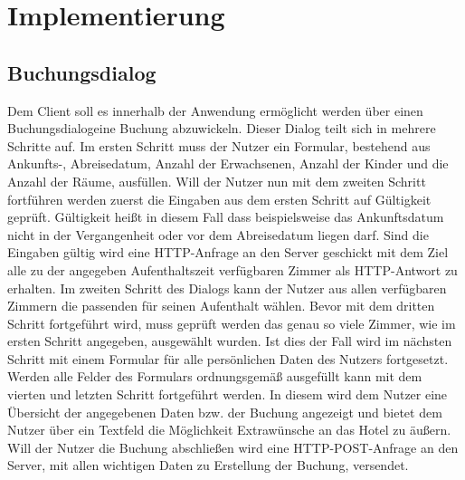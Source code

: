 \chapter{Implementierung}
\section{Buchungsdialog}
Dem Client soll es innerhalb der Anwendung ermöglicht werden über einen \glqq Buchungsdialog\grqq \thickspace eine Buchung abzuwickeln. Dieser Dialog teilt sich in mehrere Schritte auf. Im ersten Schritt muss der Nutzer ein Formular, bestehend aus Ankunfts-, Abreisedatum, Anzahl der Erwachsenen, Anzahl der Kinder und die Anzahl der Räume, ausfüllen. Will der Nutzer nun mit dem zweiten Schritt fortführen werden zuerst die Eingaben aus dem ersten Schritt auf Gültigkeit geprüft. Gültigkeit heißt in diesem Fall dass beispielsweise das Ankunftsdatum nicht in der Vergangenheit oder vor dem Abreisedatum liegen darf. Sind die Eingaben gültig wird eine HTTP-Anfrage an den Server geschickt mit dem Ziel alle zu der angegeben Aufenthaltszeit verfügbaren Zimmer als HTTP-Antwort zu erhalten. Im zweiten Schritt des Dialogs kann der Nutzer aus allen verfügbaren Zimmern die passenden für seinen Aufenthalt wählen. Bevor mit dem dritten Schritt fortgeführt wird, muss geprüft werden das genau so viele Zimmer, wie im ersten Schritt angegeben, ausgewählt wurden. Ist dies der Fall wird im nächsten Schritt mit einem Formular für alle persönlichen Daten des Nutzers fortgesetzt. Werden alle Felder des Formulars ordnungsgemäß ausgefüllt kann mit dem vierten und letzten Schritt fortgeführt werden. In diesem wird dem Nutzer eine Übersicht der angegebenen Daten bzw. der Buchung angezeigt und bietet dem Nutzer über ein Textfeld die Möglichkeit Extrawünsche an das Hotel zu äußern. Will der Nutzer die Buchung abschließen wird eine HTTP-POST-Anfrage an den Server, mit allen wichtigen Daten zu Erstellung der Buchung, versendet.

